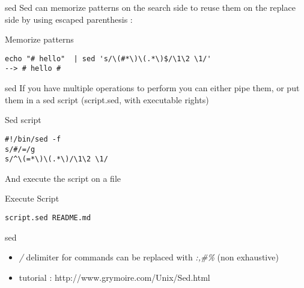 \begin{frame}[fragile]{sed}
Sed can memorize patterns on the search side to reuse them on the replace side by using escaped parenthesis :
\pause
  \begin{exampleblock}{Memorize patterns}
    \begin{lstlisting}[showstringspaces=false,basicstyle=\tiny]
echo "# hello"  | sed 's/\(#*\)\(.*\)$/\1\2 \1/'
--> # hello #
    \end{lstlisting}
  \end{exampleblock}
\end{frame}

\begin{frame}[fragile]{sed}
If you have multiple operations to perform you can either pipe them, or put them in a sed script (script.sed, with executable rights)
\pause
  \begin{exampleblock}{Sed script}
    \begin{lstlisting}[showstringspaces=false,basicstyle=\tiny]
#!/bin/sed -f
s/#/=/g
s/^\(=*\)\(.*\)/\1\2 \1/
    \end{lstlisting}
  \end{exampleblock}

\pause
And execute the script on a file
  \begin{exampleblock}{Execute Script}
    \begin{lstlisting}[showstringspaces=false,basicstyle=\tiny]
script.sed README.md
    \end{lstlisting}
  \end{exampleblock}
\end{frame}


\begin{frame}[fragile]{sed}
  \begin{itemize}
    \item\emph{/} delimiter for commands can be replaced with \emph{:,\#\%} (non exhaustive)
    \pause
    
    \item tutorial : http://www.grymoire.com/Unix/Sed.html
  \end{itemize}
\end{frame}
